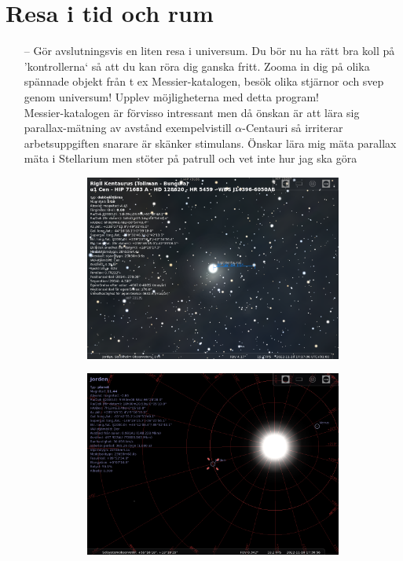 \documentclass[./exercises.tex]{subfiles}
\begin{document}
\section{Resa i tid och rum}
\begin{itemize}
\item[--] Gör avslutningsvis en liten resa i universum. Du bör nu ha rätt bra koll på ’kontrollerna‘ så att du
kan röra dig ganska fritt.
Zooma in dig på olika spännade objekt från t ex Messier-katalogen, besök olika stjärnor och svep
genom universum! Upplev möjligheterna med detta program!\\

Messier-katalogen är förvisso intressant men då önskan är att lära sig parallax-mätning av avstånd
exempelvistill $\alpha$-Centauri så irriterar arbetsuppgiften snarare är skänker stimulans.
Önskar lära mig mäta parallax mäta i Stellarium men stöter på patrull och vet inte hur jag ska göra
\begin{figure}[H]
     \centering
     \begin{subfigure}[b]{0.45\textwidth}
         \centering
         \includegraphics[width=\textwidth]{Stellarium1/Centauri/stellarium-001.png}
         \caption{}
         \label{fig:y equals x}
     \end{subfigure}
     \hfill
     \begin{subfigure}[b]{0.45\textwidth}
         \centering
         \includegraphics[width=\textwidth]{Stellarium1/Centauri/stellarium-002.png}

\end{subfigure}
\end{figure}
\end{itemize}
\end{document}
